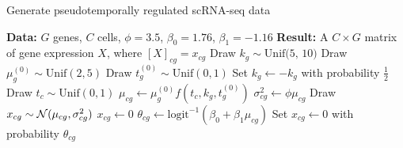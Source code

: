 \begin{algorithm}                      %
\caption{Generate pseudotemporally regulated scRNA-seq data}          %
\label{alg:synth}                           %
\begin{algorithmic}[1]                    %
\State \textbf{Data:} $G$ genes, $C$ cells, $\phi = 3.5$, $\beta_0 = 1.76$, $\beta_1 = -1.16$
\State \textbf{Result:} A $C \times G$ matrix of gene expression $X$, where $[X]_{cg} = x_{cg}$
	\State Draw $k_g \sim \text{Unif(5, 10)}$
	\State Draw $\mu_g^{(0)} \sim \text{Unif}(2, 5)$
	\State Draw $t_g^{(0)} \sim \text{Unif}(0,1)$
	\State Set $k_g \gets -k_g$ with probability $\frac{1}{2}$
		\State Draw $t_c \sim \text{Unif}(0,1)$
		\State $\mu_{cg} \gets \mu_g^{(0)} f(t_c, k_g, t_g^{(0)})$
		\State $\sigma^2_{cg} \gets \phi \mu_{cg}$
		\State Draw $x_{cg} \sim \mathcal{N}(\mu_{cg}, \sigma_{cg}^2)$
			\State $x_{cg} \gets 0$
		\EndIf
		\State $\theta_{cg} \gets \text{logit}^{-1}(\beta_0 + \beta_1 \mu_{cg})$
		\State Set $x_{cg} \gets 0$ with probability $\theta_{cg}$
	\EndFor
\EndFor
\end{algorithmic}
\end{algorithm}

